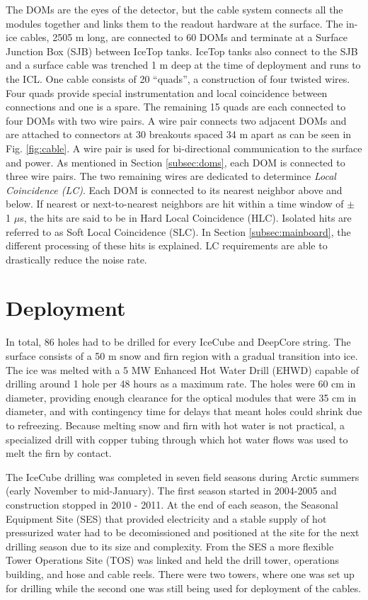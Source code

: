 The DOMs are the eyes of the detector, but the cable system connects all the modules together and links them to the readout hardware at the surface. The in-ice cables, 2505 m long, are connected to 60 DOMs and terminate at a Surface Junction Box (SJB) between IceTop tanks. IceTop tanks also connect to the SJB and a surface cable was trenched 1 m deep at the time of deployment and runs to the ICL. One cable consists of 20 ``quads'', a construction of four twisted wires. Four quads provide special instrumentation and local coincidence between connections and one is a spare. The remaining 15 quads are each connected to four DOMs with two wire pairs. A wire pair connects two adjacent DOMs and are attached to connectors at 30 breakouts spaced 34 m apart as can be seen in Fig. \ref{fig:cable}. A wire pair is used for bi-directional communication to the surface and power. As mentioned in Section \ref{subsec:doms}, each DOM is connected to three wire pairs. The two remaining wires are dedicated to determince \textit{Local Coincidence (LC)}. Each DOM is connected to its nearest neighbor above and below. If nearest or next-to-nearest neighbors are hit within a time window of $\pm$ 1 $\mu$s, the hits are said to be in Hard Local Coincidence (HLC). Isolated hits are referred to as Soft Local Coincidence (SLC). In Section \ref{subsec:mainboard}, the different processing of these hits is explained. LC requirements are able to drastically reduce the noise rate.

\section{Deployment}
\label{sec:deployment}
In total, 86 holes had to be drilled for every IceCube and DeepCore string. The surface consists of a 50 m snow and firn region with a gradual transition into ice. The ice was melted with a 5 MW Enhanced Hot Water Drill (EHWD) capable of drilling around 1 hole per 48 hours as a maximum rate. The holes were 60 cm in diameter, providing enough clearance for the optical modules that were 35 cm in diameter, and with contingency time for delays that meant holes could shrink due to refreezing. Because melting snow and firn with hot water is not practical, a specialized drill with copper tubing through which hot water flows was used to melt the firn by contact.

The IceCube drilling was completed in seven field seasons during Arctic summers (early November to mid-January). The first season started in 2004-2005 and construction stopped in 2010 - 2011. At the end of each season, the Seasonal Equipment Site (SES) that provided electricity and a stable supply of hot pressurized water had to be decomissioned and positioned at the site for the next drilling season due to its size and complexity. From the SES a more flexible Tower Operations Site (TOS) was linked and held the drill tower, operations building, and hose and cable reels. There were two towers, where one was set up for drilling while the second one was still being used for deployment of the cables.

